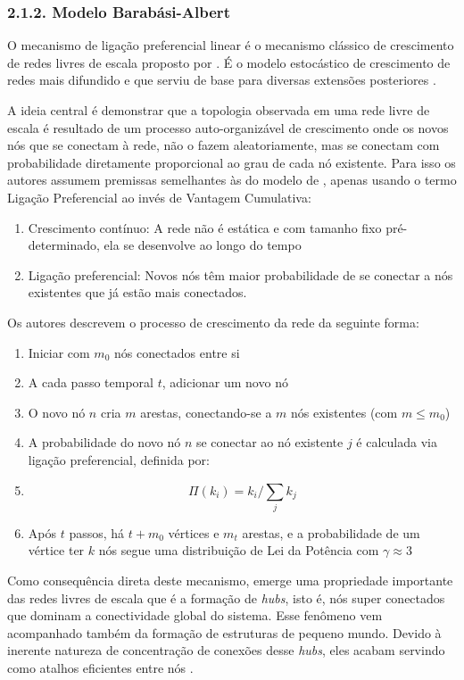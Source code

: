 \documentclass[12pt,oneside,a4paper,brazil,sumario=tradicional]{abntex2}
\begin{document}
\subsubsection*{2.1.2. Modelo Barabási-Albert}
O mecanismo de ligação preferencial linear é o mecanismo clássico de crescimento de redes livres de escala proposto por . É o modelo estocástico de crescimento de redes mais difundido e que serviu de base para diversas extensões posteriores \cite{albert2000, amaral2000, bianconi2001, holme2002, dorogovtsvev2000}.

A ideia central é demonstrar que a topologia observada em uma rede livre de escala é resultado de um processo auto-organizável de crescimento onde os novos nós que se conectam à rede, não o fazem aleatoriamente, mas se conectam com probabilidade diretamente proporcional ao grau de cada nó existente. Para isso os autores assumem premissas semelhantes às do modelo de , apenas usando o termo Ligação Preferencial ao invés de Vantagem Cumulativa:

\begin{enumerate}
  \item Crescimento contínuo: A rede não é estática e com tamanho fixo pré-determinado, ela se desenvolve ao longo do tempo
  \item Ligação preferencial: Novos nós têm maior probabilidade de se conectar a nós existentes que já estão mais conectados.
\end{enumerate}
Os autores descrevem o processo de crescimento da rede da seguinte forma:

\begin{enumerate}
  \item Iniciar com $m_{0}$ nós conectados entre si
  \item A cada passo temporal $t$, adicionar um novo nó
  \item O novo nó $n$ cria $m$ arestas, conectando-se a $m$ nós existentes (com $m \le m_{0}$)
  \item A probabilidade do novo nó $n$ se conectar ao nó existente $j$ é calculada via ligação preferencial, definida por:
  \item[] \[\Pi(k_{i}) = k_{i} / \sum_{j} k_{j}\]
  \item Após $t$ passos, há $t + m_{0}$ vértices e $m_{t}$ arestas, e a probabilidade de um vértice ter $k$ nós segue uma distribuição de Lei da Potência com $\gamma \approx 3$
\end{enumerate}
Como consequência direta deste mecanismo, emerge uma propriedade importante das redes livres de escala que é a formação de \textit{hubs}, isto é, nós super conectados que dominam a conectividade global do sistema. Esse fenômeno vem acompanhado também da formação de estruturas de pequeno mundo. Devido à inerente natureza de concentração de conexões desse \textit{hubs}, eles acabam servindo como atalhos eficientes entre nós \cite{wang2003}.
\end{document}

